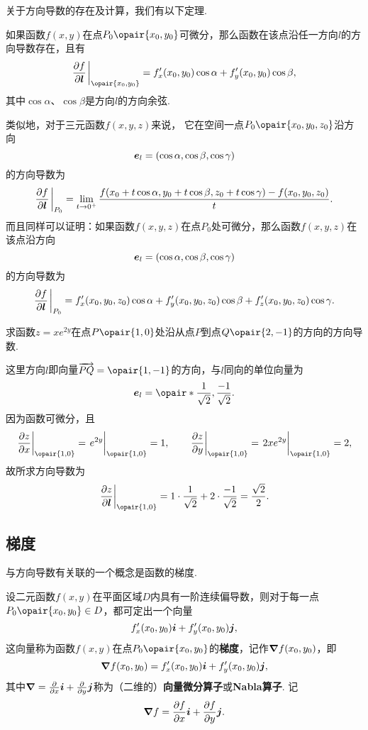 关于方向导数的存在及计算，我们有以下定理.
\begin{theorem}[充分条件]
如果函数\(f(x,y)\)在点\(P_0\opair{x_0,y_0}\)可微分，那么函数在该点沿任一方向\(l\)的方向导数存在，且有\[
\pdv{f}{\mat{l}}\eval_{\opair{x_0,y_0}}
=f'_x(x_0,y_0) \cos\alpha + f'_y(x_0,y_0) \cos\beta,
\]其中\(\cos\alpha\)、\(\cos\beta\)是方向\(l\)的方向余弦.
\end{theorem}

类似地，对于三元函数\(f(x,y,z)\)来说，%
它在空间一点\(P_0\opair{x_0,y_0,z_0}\)沿方向\[
	\boldsymbol{e}_l = (\cos\alpha,\cos\beta,\cos\gamma)
\]的方向导数为\[
	\pdv{f}{\mat{l}}\eval_{P_0}
	= \lim\limits_{t\to0^+}
	\frac{f(x_0+t\cos\alpha,y_0+t\cos\beta,z_0+t\cos\gamma)-f(x_0,y_0,z_0)}{t}.
\]
而且同样可以证明：如果函数\(f(x,y,z)\)在点\(P_0\)处可微分，那么函数\(f(x,y,z)\)在该点沿方向\[
	\boldsymbol{e}_l = (\cos\alpha,\cos\beta,\cos\gamma)
\]的方向导数为\[
\pdv{f}{\mat{l}}\eval_{P_0}
= f'_x(x_0,y_0,z_0) \cos\alpha + f'_y(x_0,y_0,z_0) \cos\beta + f'_z(x_0,y_0,z_0) \cos\gamma.
\]

\begin{example}
求函数\(z = x e^{2y}\)在点\(P\opair{1,0}\)处沿从点\(P\)到点\(Q\opair{2,-1}\)的方向的方向导数.
\begin{solution}
这里方向\(l\)即向量\(\vec{PQ} = \opair{1,-1}\)的方向，与\(l\)同向的单位向量为\[
\mat{e}_l = \opair*{\frac{1}{\sqrt{2}},\frac{-1}{\sqrt{2}}}.
\]因为函数可微分，且\[
\eval{\pdv{z}{x}}_{\opair{1,0}}
= \eval{e^{2y}}_{\opair{1,0}}
= 1,
\qquad
\eval{\pdv{z}{y}}_{\opair{1,0}}
= \eval{2xe^{2y}}_{\opair{1,0}}
= 2,
\]故所求方向导数为\[
\eval{\pdv{z}{\mat{l}}}_{\opair{1,0}}
= 1 \cdot \frac{1}{\sqrt{2}} + 2 \cdot \frac{-1}{\sqrt{2}}
= \frac{\sqrt{2}}{2}.
\]
\end{solution}
\end{example}

\subsection{梯度}
与方向导数有关联的一个概念是函数的梯度.
\begin{definition}
设二元函数\(f(x,y)\)在平面区域\(D\)内具有一阶连续偏导数，则对于每一点\(P_0\opair{x_0,y_0} \in D\)，都可定出一个向量\[
f'_x(x_0,y_0) \boldsymbol{i} + f'_y(x_0,y_0) \boldsymbol{j},
\]这向量称为函数\(f(x,y)\)在点\(P_0\opair{x_0,y_0}\)的\textbf{梯度}，记作\(\grad{f}(x_0,y_0)\)，即\[
\grad{f}(x_0,y_0)
= f'_x(x_0,y_0) \boldsymbol{i} + f'_y(x_0,y_0) \boldsymbol{j},
\]其中\(\grad = \pdv{x} \boldsymbol{i} + \pdv{y} \boldsymbol{j}\)称为（二维的）\textbf{向量微分算子}或\textbf{Nabla算子}.
记\[
\grad{f} = \pdv{f}{x} \boldsymbol{i} + \pdv{f}{y} \boldsymbol{j}.
\]
\end{definition}

